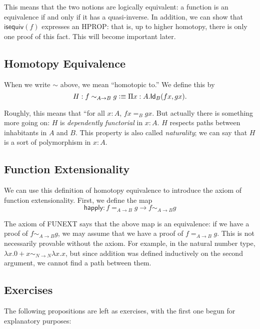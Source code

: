 \documentclass[12pt]{article}
\newcommand{\iseq}{\mathsf{isequiv}}
\newcommand{\happ}{\mathsf{happly}}
\begin{document}
This means that the two notions are logically equivalent: a function is an equivalence
if and only if it has a quasi-inverse. In addition, we can show that $\iseq(f)$ 
expresses an HPROP: that is, up to higher homotopy, there is only one proof of this fact.
This will become important later.


\subsection{Homotopy Equivalence}

When we write $\sim$ above, we mean ``homotopic to.'' We define this by
$$ H: f\sim_{A\to B} g \vcentcolon\equiv \Pi x:A.\mathsf{Id}_{B} (f x, g x).$$

Roughly, this means that ``for all $x:A$, $f x =_B g x$. But actually there is something more
going on: $H$ is \emph{dependently functorial} in $x:A$. $H$ respects paths between inhabitants
in $A$ and $B$. This property is also called \emph{naturality}; we can say that $H$ is
a sort of polymorphism in $x:A$. 


\subsection{Function Extensionality}

We can use this definition of homotopy equivalence to introduce the axiom of function
extensionality. First, we define the map
$$ \happ: f =_{A\to B} g \to f\sim_{A\to B} g$$

The axiom of FUNEXT says that the above map is an equivalence: if we have a proof
of $f \sim_{A\to B} g$, we may assume that we have a proof of $f =_{A\to B} g$. This is not
necessarily provable without the axiom. For example, in the natural number type,
$\lambda x.0+x \sim_{N\to N} \lambda x.x$, but since addition was defined inductively on the
second argument, we cannot find a path between them.

\subsection{Exercises}
The following propositions are left as exercises, with the first one begun for explanatory
purposes:
\end{document}

